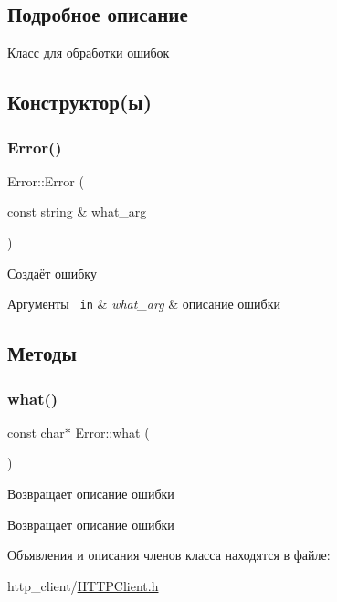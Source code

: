 \subsection{Подробное описание}
Класс для обработки ошибок 

\subsection{Конструктор(ы)}
\mbox{\label{classError_a66e4b23485049435a2d454f80083f38c}} 
\subsubsection{\texorpdfstring{Error()}{Error()}}
{\footnotesize\ttfamily Error\+::\+Error (\begin{DoxyParamCaption}\item[{const string \&}]{what\+\_\+arg }\end{DoxyParamCaption})\hspace{0.3cm}{\ttfamily [inline]}}



Создаёт ошибку 


\begin{DoxyParams}[1]{Аргументы}
\mbox{\texttt{ in}}  & {\em what\+\_\+arg} & описание ошибки \\
\hline
\end{DoxyParams}


\subsection{Методы}
\mbox{\label{classError_a57dd37fd445e3182ed9da6ebfd2a28c0}} 
\subsubsection{\texorpdfstring{what()}{what()}}
{\footnotesize\ttfamily const char$\ast$ Error\+::what (\begin{DoxyParamCaption}{ }\end{DoxyParamCaption})\hspace{0.3cm}{\ttfamily [inline]}}



Возвращает описание ошибки 

\begin{DoxyReturn}{Возвращает}
описание ошибки 
\end{DoxyReturn}


Объявления и описания членов класса находятся в файле\+:\begin{DoxyCompactItemize}
\item 
http\+\_\+client/\mbox{\hyperlink{HTTPClient_8h}{H\+T\+T\+P\+Client.\+h}}\end{DoxyCompactItemize}
